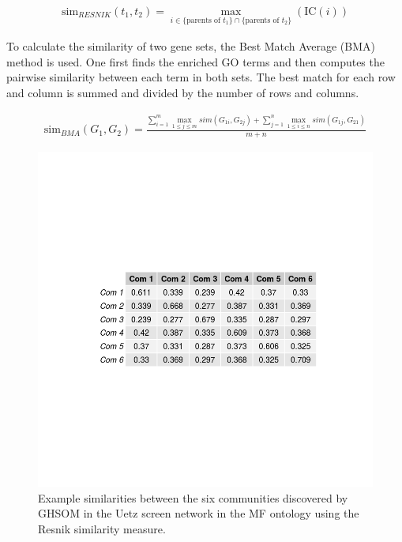 \documentclass{report}
\begin{document}
	\begin{align}
	\text{sim}_{RESNIK}(t_1, t_2) = \max_{i \in \{\text{parents of }t_1\} \cap \{\text{parents of } t_2\}}(\text{IC}(i))
	\end{align}
	
	To calculate the similarity of two gene sets, the Best Match Average (BMA) method is used. One first finds the enriched GO terms and then computes the pairwise similarity between each term in both sets. The best match for each row and column is summed and divided by the number of rows and columns.
	
	\begin{align}
	\text{sim}_{BMA}(G_1, G_2) = \frac{\sum_{i = 1}^{m} \max_{1\leq j\leq m} sim(G_{1i}, G_{2j}) + \sum_{j = 1}^{n} \max_{1\leq i\leq n} sim(G_{1j}, G_{21})}{m + n}
	\end{align}
	
	\begin{figure}
		\centering
		\includegraphics[width=\textwidth]{../resnik.png}
		\caption{Example similarities between the six communities discovered by GHSOM in the Uetz screen network in the MF ontology using the Resnik similarity measure.}
		\label{resnik}
	\end{figure}
	
\end{document}
